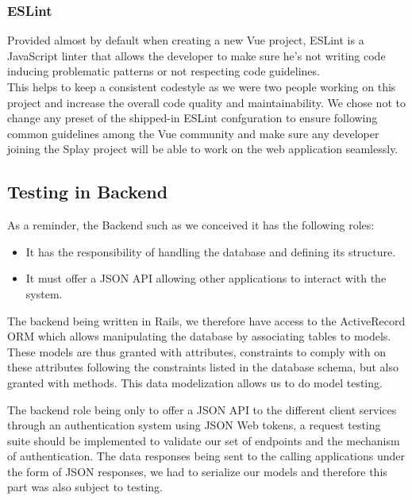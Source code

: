 \documentclass{eplmastersthesis}
\begin{document}
        \subsubsection{ESLint}

          Provided almost by default when creating a new Vue project, ESLint
          \cite{eslint} is a JavaScript linter that allows the developer to
          make sure he's not writing code inducing problematic patterns or not
          respecting code guidelines.\\
          This helps to keep a consistent codestyle as we were two people working
          on this project and increase the overall code quality and
          maintainability. We chose not to change any preset of the shipped-in
          ESLint confguration to ensure following common guidelines among the Vue
          community and make sure any developer joining the Splay project will
          be able to work on the web application seamlessly.

      \subsection{Testing in Backend}

        As a reminder, the Backend such as we conceived it has the following
        roles:

        \begin{itemize}
          \item It has the responsibility of handling the database and
          defining its structure.
          \item It must offer a JSON API allowing other applications to interact
          with the system.
        \end{itemize}

        The backend being written in Rails, we therefore have access to the
        ActiveRecord ORM which allows manipulating the database by associating
        tables to models. These models are thus granted with attributes,
        constraints to comply with on these attributes following the constraints
        listed in the database schema, but also granted with methods. This data
        modelization allows us to do model testing.

        The backend role being only to offer a JSON API to the different client
        services through an authentication system using JSON Web tokens, a
        request testing suite should be implemented to validate our set of
        endpoints and the mechanism of authentication.
        The data responses being sent to the calling applications under the form
        of JSON responses, we had to serialize our models and therefore this
        part was also subject to testing.
\end{document}
